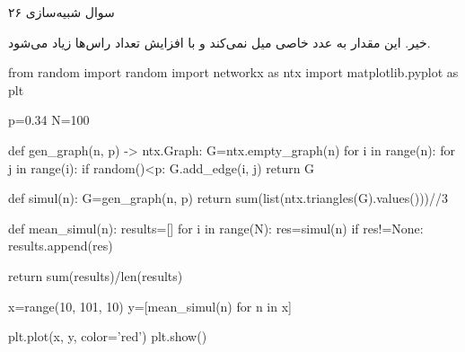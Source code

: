 سوال شبیه‌سازی ۲۶

خیر. این مقدار به عدد خاصی میل نمی‌کند و با افزایش تعداد راس‌ها زیاد می‌شود.

\begin{latin}
\begin{python}
from random import random
import networkx as ntx
import matplotlib.pyplot as plt

p=0.34
N=100

def gen_graph(n, p) -> ntx.Graph:
	G=ntx.empty_graph(n)
	for i in range(n):
		for j in range(i):
			if random()<p:
				G.add_edge(i, j)
	return G

def simul(n):
	G=gen_graph(n, p)
	return sum(list(ntx.triangles(G).values()))//3

def mean_simul(n):
	results=[]
	for i in range(N):
		res=simul(n)
		if res!=None:
			results.append(res)
	
	return sum(results)/len(results)


x=range(10, 101, 10)
y=[mean_simul(n) for n in x]

plt.plot(x, y, color='red')
plt.show()
\end{python}
\end{latin}